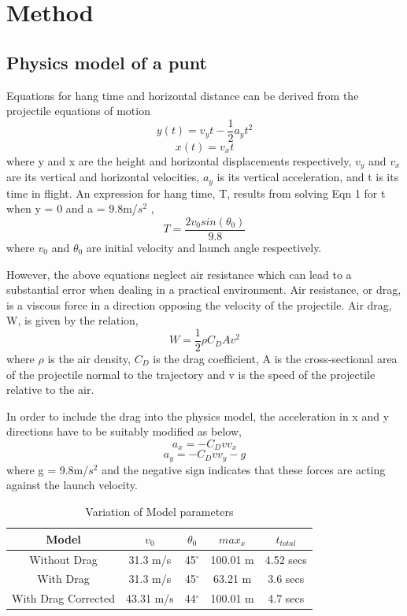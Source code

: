 \documentclass[conference]{IEEEtran}
\begin{document}
\section{Method}
\subsection{Physics model of a punt}
Equations for hang time and horizontal distance can be derived from the projectile equations of motion
\begin{equation}
y(t) = v_{y}t - \frac{1}{2}a_{y}t^{2}
\end{equation}
\begin{equation}
x(t) = v_{x}t
\end{equation}
where y and x are the height and horizontal displacements respectively, $v_{y}$ and $v_{x}$ are its vertical and horizontal velocities, $a_{y}$ is its vertical acceleration, and t is its time in flight. An expression for hang time, T, results from solving Eqn 1 for t when y = 0 and a = 9.8m/$s^{2}$ ,
\begin{equation}
T = \frac{2v_{0} sin(\theta_{0})}{9.8}
\end{equation}
where $v_{0}$ and $\theta_{0}$ are initial velocity and launch angle respectively. 

However, the above equations neglect air resistance which can lead to a substantial error when dealing in a practical environment. Air resistance, or drag, is a viscous force in a direction opposing the velocity of the projectile. Air drag, W, is given by the relation,
\begin{equation}
W = \frac{1}{2}\rho{C_{D}}Av^{2} 
\end{equation}
where $\rho$ is the air density, $C_{D}$ is the drag coefficient, A is the cross-sectional area of the projectile normal to the trajectory and v is the speed of the projectile relative to the air.

In order to include the drag into the physics model, the acceleration in x and y directions have to be suitably modified as below,
\begin{equation}
a_{x} = -C_{D}vv_{x}
\end{equation}
\begin{equation}
a_{y} = -C_{D}vv_{y} - g
\end{equation}
where g = 9.8m/$s^{2}$ and the negative sign indicates that these forces are acting against the launch velocity. 

\begin{table}[t]
\centering
\caption{Variation of Model parameters}
\begin{tabular}{  | c | c | c | c | c |}
  \hline
  Model & $v_{0}$ & $\theta_{0}$ & $max_{x}$ & $t_{total}$\\
  \hline 
  Without Drag  & 31.3 m/s  & 45$^{\circ}$ & 100.01 m & 4.52 secs  \\ 
  \hline
  With Drag  & 31.3 m/s  & 45$^{\circ}$ & 63.21 m & 3.6 secs  \\
  \hline
  With Drag Corrected  & 43.31 m/s  & 44$^{\circ}$ & 100.01 m & 4.7 secs  \\
  \hline
\end{tabular}
\label{tab:tab1}
\end{table}
\end{document}
